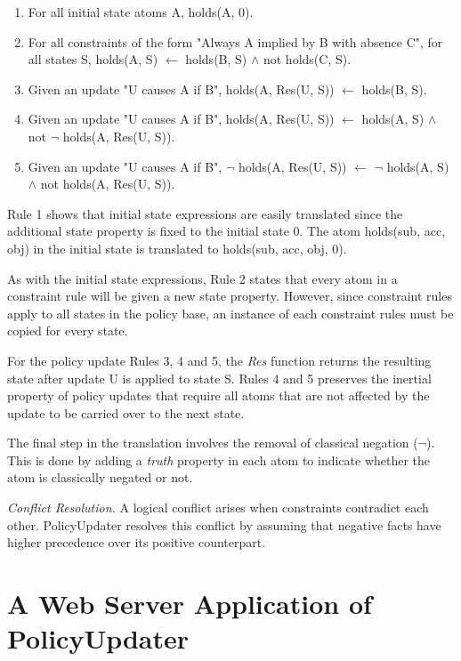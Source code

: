 \documentclass{llncs}
\begin{document}
    \begin{enumerate}
      \item
        For all initial state atoms A, holds(A, 0).
      \item
        For all constraints of the form "Always A implied by B with
        absence C", for all states S, holds(A, S) $\leftarrow$ holds(B, S)
        $\land$ not holds(C, S).
      \item
        Given an update "U causes A if B", holds(A, Res(U, S)) $\leftarrow$
        holds(B, S).
      \item
        Given an update "U causes A if B", holds(A, Res(U, S)) $\leftarrow$
        holds(A, S) $\land$ not $\lnot$ holds(A, Res(U, S)).
      \item
        Given an update "U causes A if B", $\lnot$ holds(A, Res(U, S))
        $\leftarrow$ $\lnot$ holds(A, S) $\land$ not holds(A, Res(U, S)).
    \end{enumerate}

    Rule 1 shows that initial state expressions are easily translated since
    the additional state property is fixed to the initial state 0. The atom
    holds(sub, acc, obj) in the initial state is translated to holds(sub,
    acc, obj, 0).

    As with the initial state expressions, Rule 2 states that every atom in a
    constraint rule will be given a new state property. However, since
    constraint rules apply to all states in the policy base, an instance of
    each constraint rules must be copied for every state.

    For the policy update Rules 3, 4 and 5, the \emph{Res} function returns
    the resulting state after update U is applied to state S. Rules 4 and
    5 preserves the inertial property of policy updates that require all atoms
    that are not affected by the update to be carried over to the next state.

    The final step in the translation involves the removal of classical
    negation ($\lnot$). This is done by adding a \emph{truth} property
    in each atom to indicate whether the atom is classically negated or not.

    \noindent
    \emph{Conflict Resolution.} A logical conflict arises when constraints
    contradict each other. PolicyUpdater resolves this conflict by assuming
    that negative facts have higher precedence over its positive counterpart.

  \section{A Web Server Application of PolicyUpdater}
\end{document}
